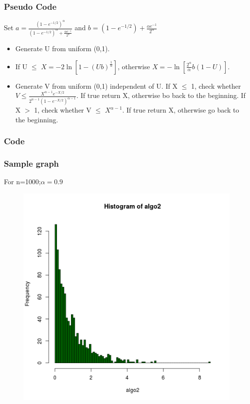 \documentclass[11pt]{article}
\begin{document}
\subsubsection{Pseudo Code}
Set $a = \frac{\left(1-e^{-1/2}\right)^{\alpha}}{\left(1-e^{-1/2}\right)^{\alpha}+\frac{\alpha e^{-1}}{2^\alpha}}$ and $b = \left(1-e^{-1/2}\right) + \frac{\alpha e^{-1}}{2^\alpha}$
\begin{itemize}
\item Generate U from uniform (0,1).
\item If U $\leq$ $X = -2\ln\left[1-(Ub)^{\frac{1}{\alpha}}\right]$, otherwise $X = -\ln\left[\frac{2^\alpha}{\alpha}b(1-U)\right]$.
\item Generate V from uniform (0,1) independent of U. If X $\leq$ 1, check whether $V \leq \frac{X^{\alpha-1}e^{-X/2}}{2^{\alpha-1}\left(1-e^{-X/2}\right)^{\alpha-1}}.$ If true return X, otherwise bo back to the beginning. If X $>$ 1, check whether V $\leq$ $X^{\alpha-1}$. If true return X, otherwise go back to the beginning.
\end{itemize}
\subsubsection{Code}

\subsubsection{Sample graph}
For n=1000;$\alpha=0.9$
\begin{figure}[H]
\centering
\includegraphics[scale=.65]{image4}
\end{figure}
\end{document}
